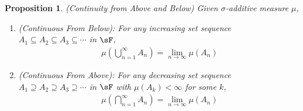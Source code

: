 \documentclass[12pt]{article}
\theoremstyle{plain}
\newtheorem{prop}[thm]{Proposition}
\theoremstyle{definition}
\theoremstyle{remark}
\begin{document}
\begin{prop}\emph{(Continuity from Above and Below)}
\label{prop:prop-meas}
Given $\sigma$-additive measure $\mu$,
\begin{enumerate}
  \item \emph{(Continuous From Below)}: For any increasing
    set sequence $A_1\subseteq A_2\subseteq A_3 \subseteq \cdots$ in
    $\sF$,
    \begin{align*}
      \mu\left(\bigcup^\infty_{n=1} A_n\right) =
      \lim_{n\rightarrow\infty} \mu(A_n)
    \end{align*}

  \item \emph{(Continuous From Above)}:
    For any decreasing set sequence $A_1 \supseteq A_2 \supseteq A_3
    \supseteq \cdots$ in $\sF$
    with $\mu(A_k)<\infty$ for some $k$,
    \begin{align*}
      \mu\left(\bigcap^\infty_{n=1} A_n\right)
      = \lim_{n\rightarrow\infty} \mu(A_n)
    \end{align*}
\end{enumerate}
\end{prop}
\end{document}
